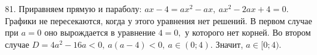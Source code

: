 81. Приравняем прямую и параболу: $ax-4=ax^2-ax,\ ax^2-2ax+4=0.$ Графики не пересекаются, когда у этого уравнения нет решений. В первом случае при $a=0$ оно вырождается в уравнение $4=0,$ у которого нет корней. Во втором случае $D=4a^2-16a<0,\ a(a-4)<0,\ a\in(0;4).$ Значит, $a\in[0;4).$\\
